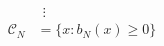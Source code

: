 \documentclass[preview]{standalone}
\begin{document}
\begin{align*}
& \ \ \vdots\\ \mathcal{C}_N &= \{ x : b_N(x) \geq 0 \}
\end{align*}
\end{document}
